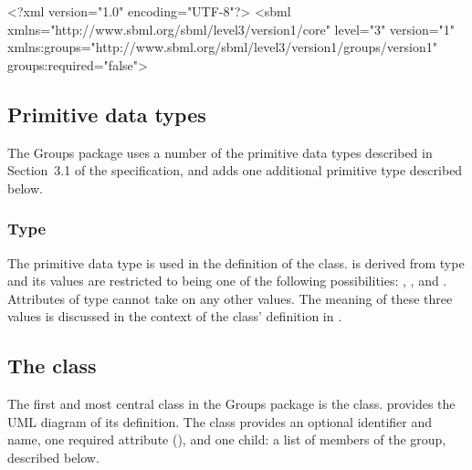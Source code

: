 \begin{example}
<?xml version="1.0" encoding="UTF-8"?>
<sbml xmlns="http://www.sbml.org/sbml/level3/version1/core" level="3" version="1"
      xmlns:groups="http://www.sbml.org/sbml/level3/version1/groups/version1"
      groups:required="false">
\end{example}


\subsection{Primitive data types}
\label{new-primitive-types}

The Groups package uses a number of the primitive data types described in Section~3.1 of the \sbmlthreecore specification, and adds one additional primitive type described below.


\subsubsection{Type \fixttspace{}}
\label{primtype-groupkind}

The  primitive data type is used in the definition of the \Group class.   is derived from type  and its values are restricted to being one of the following possibilities: , , and .  Attributes of type  cannot take on any other values.  The meaning of these three values is discussed in the context of the \Group class' definition in .


\subsection{The  class}
\label{group-class}

The first and most central class in the Groups package is the \Group class.   provides the UML diagram of its definition.  The \Group class provides an optional identifier and name, one required attribute (), and one child:  a list of members of the group, described below.

